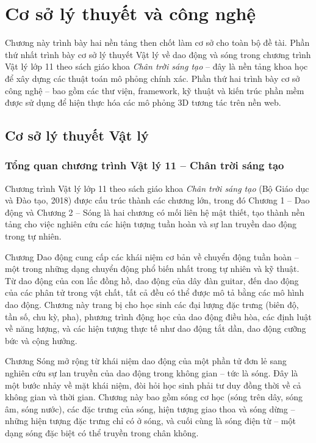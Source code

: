 
\chapter{Cơ sở lý thuyết và công nghệ}

Chương này trình bày hai nền tảng then chốt làm cơ sở cho toàn bộ đề tài. Phần thứ nhất trình bày cơ sở lý thuyết Vật lý về dao động và sóng trong chương trình Vật lý lớp 11 theo sách giáo khoa \textit{Chân trời sáng tạo} – đây là nền tảng khoa học để xây dựng các thuật toán mô phỏng chính xác. Phần thứ hai trình bày cơ sở công nghệ – bao gồm các thư viện, framework, kỹ thuật và kiến trúc phần mềm được sử dụng để hiện thực hóa các mô phỏng 3D tương tác trên nền web.

\section{Cơ sở lý thuyết Vật lý}

\subsection{Tổng quan chương trình Vật lý 11 – Chân trời sáng tạo}

Chương trình Vật lý lớp 11 theo sách giáo khoa \textit{Chân trời sáng tạo} (Bộ Giáo dục và Đào tạo, 2018) được cấu trúc thành các chương lớn, trong đó Chương 1 – Dao động và Chương 2 – Sóng là hai chương có mối liên hệ mật thiết, tạo thành nền tảng cho việc nghiên cứu các hiện tượng tuần hoàn và sự lan truyền dao động trong tự nhiên.

Chương Dao động cung cấp các khái niệm cơ bản về chuyển động tuần hoàn – một trong những dạng chuyển động phổ biến nhất trong tự nhiên và kỹ thuật. Từ dao động của con lắc đồng hồ, dao động của dây đàn guitar, đến dao động của các phân tử trong vật chất, tất cả đều có thể được mô tả bằng các mô hình dao động. Chương này trang bị cho học sinh các đại lượng đặc trưng (biên độ, tần số, chu kỳ, pha), phương trình động học của dao động điều hòa, các định luật về năng lượng, và các hiện tượng thực tế như dao động tắt dần, dao động cưỡng bức và cộng hưởng.

Chương Sóng mở rộng từ khái niệm dao động của một phần tử đơn lẻ sang nghiên cứu sự lan truyền của dao động trong không gian – tức là sóng. Đây là một bước nhảy về mặt khái niệm, đòi hỏi học sinh phải tư duy đồng thời về cả không gian và thời gian. Chương này bao gồm sóng cơ học (sóng trên dây, sóng âm, sóng nước), các đặc trưng của sóng, hiện tượng giao thoa và sóng dừng – những hiện tượng đặc trưng chỉ có ở sóng, và cuối cùng là sóng điện từ – một dạng sóng đặc biệt có thể truyền trong chân không.

